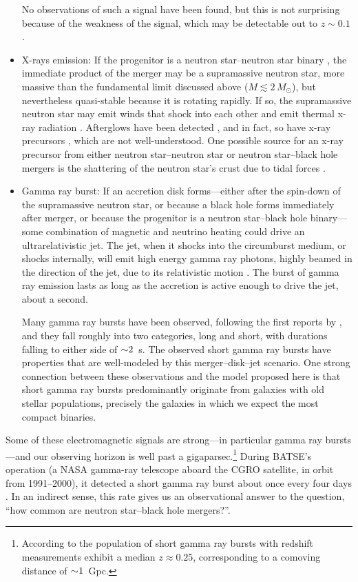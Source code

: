 \begin{itemize}
    No observations of such a signal have been found, but this is not surprising
    because of the weakness of the signal, which may be detectable out to
    $z\sim0.1$ \citep{naka2011-radio}.
  \item X-rays emission: If the progenitor is a neutron star--neutron
    star binary \nsns, the immediate product of the merger may be
    a supramassive neutron star,
    more massive than the fundamental
    limit discussed above ($M\lesssim2\,M_\odot$), but nevertheless quasi-stable
    because it is rotating rapidly.
    If so, the supramassive neutron star may emit winds that shock
    into each other and emit thermal x-ray radiation \citep{rezz2015-two_winds}.
    Afterglows have been detected \citep{fong2012-xray_afterglow}, and in fact,
    so have x-ray precursors \citep{troj2010-sgrb_precursors}, which are
    not well-understood. One possible source for an x-ray precursor from either
    neutron star--neutron star \nsns or neutron star--black hole \nsbh mergers is
    the shattering of the neutron star's crust due to tidal forces
    \citep{tsan2012-shattering}.
  \item Gamma ray burst: If an accretion disk forms---either after the
    spin-down of the supramassive neutron star, or because a black hole forms
    immediately after merger, or because the progenitor is a neutron star--black
    hole \nsbh binary---some combination of magnetic and neutrino heating
    could drive an ultrarelativistic jet. The jet, when it shocks into the
    circumburst medium, or shocks internally, will emit high energy gamma ray
    photons, highly beamed in the direction of the jet, due to its relativistic
    motion \citep{eich1989-grb_bns,nara1992-grbs_nsns_bhns}.
    The burst of gamma ray emission lasts as long as the accretion is
    active enough to drive the jet, about a second.

    Many gamma ray bursts have been observed, following the first reports by
    \citet{kleb1973-first_report_grb}, and they fall roughly into two categories,
    long and short, with durations falling to either side of $\mathord{\sim}2$~s.
    The observed short gamma ray bursts have
    properties that are well-modeled by this merger--disk--jet scenario.
    One strong connection between these observations and the model proposed here
    is that short gamma ray bursts predominantly originate from galaxies with
    old stellar populations, precisely the galaxies in which we expect the most
    compact binaries.
\end{itemize}
Some of these electromagnetic signals are strong---in particular gamma ray
bursts---and our observing horizon is well past a gigaparsec.\footnote{
According to \citet{naka2007-review_sgrb} the population of short gamma ray
bursts with redshift measurements exhibit a median $z\approx0.25$, corresponding
to a comoving distance of $\mathord{\sim}1$~Gpc.}
During BATSE's operation (a NASA gamma-ray telescope aboard the CGRO satellite,
in orbit from 1991--2000), it detected a short gamma ray burst about once every
four days \citep{naka2007-review_sgrb}.
In an indirect sense, this rate gives us an observational answer to the question,
``how common are neutron star--black hole mergers?''.

